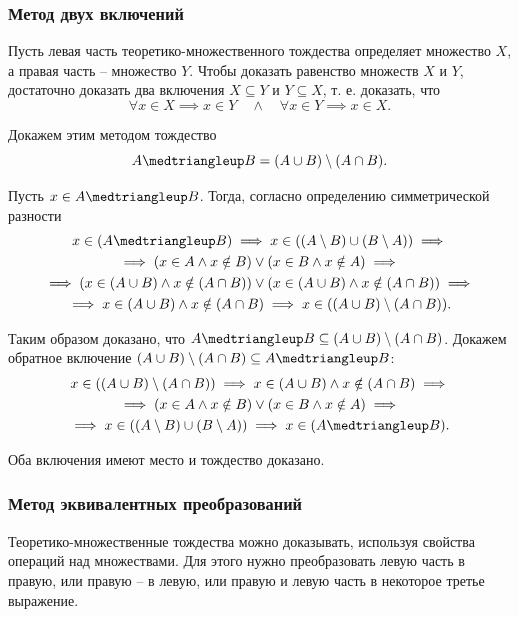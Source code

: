 \subsubsection{Метод двух включений}

Пусть левая часть теоретико-множественного тождества определяет множество \(X\), а правая часть -- множество \(Y\). Чтобы доказать равенство множеств \(X\) и \(Y\), достаточно доказать два включения \(X \subseteq Y\) и \(Y \subseteq X\), т. е. доказать, что
\[
    \forall x \in X \implies x \in Y
    \quad \land \quad
    \forall x \in Y \implies x \in X.
\]

Докажем этим методом тождество
\[
    A \symdiff B = (A \cup B) \setminus (A \cap B).
\]

Пусть \(x \in A \symdiff B\). Тогда, согласно определению симметрической разности
\begin{gather*}
    x \in (A \symdiff B) \implies
    x \in ((A \setminus B) \cup (B \setminus A)) \implies \\ \implies
    (x \in A \land x \notin B) \lor (x \in B \land x \notin A) \implies \\ \implies
    (x \in (A \cup B) \land x \notin (A \cap B)) \lor (x \in (A \cup B) \land x \notin (A \cap B)) \implies \\ \implies
    x \in (A \cup B) \land x \notin (A \cap B) \implies
    x \in ((A \cup B) \setminus (A \cap B)).
\end{gather*}

Таким образом доказано, что \(A \symdiff B \subseteq (A \cup B) \setminus (A \cap B)\). Докажем обратное включение \((A \cup B) \setminus (A \cap B) \subseteq A \symdiff B\):
\begin{gather*}
    x \in ((A \cup B) \setminus (A \cap B)) \implies
    x \in (A \cup B) \land x \notin (A \cap B) \implies \\ \implies
    (x \in A \land x \notin B) \lor (x \in B \land x \notin A) \implies \\ \implies
    x \in ((A \setminus B) \cup (B \setminus A)) \implies
    x \in (A \symdiff B).
\end{gather*}

Оба включения имеют место и тождество доказано.

\subsubsection{Метод эквивалентных преобразований}

Теоретико-множественные тождества можно доказывать, используя свойства операций над множествами. Для этого нужно преобразовать левую часть в правую, или правую -- в левую, или правую и левую часть в некоторое третье выражение.

